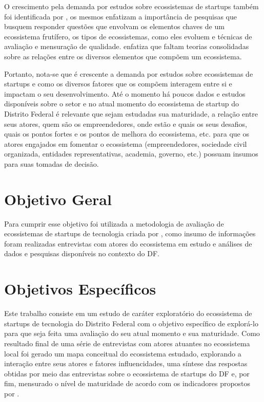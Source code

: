 O crescimento pela demanda por estudos sobre ecossistemas de startups também foi identificada por , os mesmos enfatizam a importância de pesquisas que busquem responder questões que envolvam os elementos chaves de um ecossistema frutífero, os tipos de ecossistemas, como eles evoluem e técnicas de avaliação e mensuração de qualidade.  enfatiza que faltam teorias consolidadas sobre as relações entre os diversos elementos que compõem um ecossistema.

Portanto, nota-se que é crescente a demanda por estudos sobre ecossistemas de startups e como os diversos fatores que os compõem interagem entre si e impactam o seu desenvolvimento. Até o momento há poucos dados e estudos disponíveis sobre o setor e no atual momento do ecossistema de startup do Distrito Federal é relevante que sejam estudadas sua maturidade, a relação entre seus atores, quem são os empreendedores, onde estão e quais os seus desafios, quais os pontos fortes e os pontos de melhora do ecossistema, etc. para que os atores engajados em fomentar o ecossistema (empreendedores, sociedade civil organizada, entidades representativas, academia, governo, etc.) possuam insumos para suas tomadas de decisão. 

\section{Objetivo Geral}
\label{section:objetivo_geral}

Para cumprir esse objetivo foi utilizada a metodologia de avaliação de ecossistemas de startups de tecnologia criada por , como insumo de informações foram realizadas entrevistas com atores do ecossistema em estudo e análises de dados e pesquisas disponíveis no contexto do DF.

\section{Objetivos Específicos}
\label{section:objetivos_especificos}

Este trabalho consiste em um estudo de caráter exploratório do ecossistema de startups de tecnologia do Distrito Federal com o objetivo específico de explorá-lo para que seja feita uma avaliação do seu atual momento e sua maturidade. Como resultado final de uma série de entrevistas com atores atuantes no ecossistema local foi gerado um mapa conceitual do ecossistema estudado, explorando a interação entre seus atores e fatores influencidades, uma síntese das respostas obtidas por meio das entrevistas sobre o ecossistema de startups do DF e, por fim, mensurado o nível de maturidade de acordo com os indicadores propostos por .

